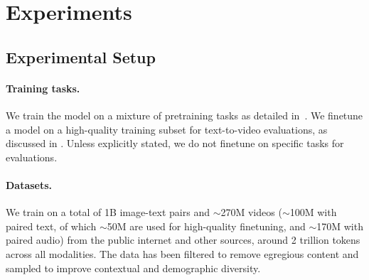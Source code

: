 




\vspace{-3mm}
\section{Experiments} \label{sec:experiments}

\vspace{-1mm}
\subsection{Experimental Setup}

\paragraph{Training tasks.}
We train the model on a mixture of pretraining tasks as detailed in~.
%
We finetune a model on a high-quality training subset for text-to-video evaluations, as discussed in .
%
Unless explicitly stated, we do not finetune on specific tasks for evaluations.

\vspace{-4mm}
\paragraph{Datasets.} 
\label{sec:exp_data}
We train on a total of 1B image-text pairs and $\sim$270M videos ($\sim$100M with paired text, of which $\sim$50M are used for high-quality finetuning,  and $\sim$170M with paired audio) from the public internet and other sources, \ie around 2 trillion tokens across all modalities. 
%
%
The data has been filtered to remove egregious content and sampled to improve contextual and demographic diversity.



\vspace{-4mm}
